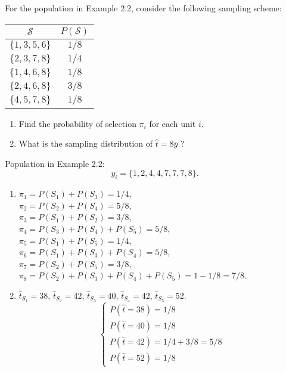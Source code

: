 \documentclass[12pt]{article}
\begin{document}
    
    \begin{exercise}[Lohr-2.2]
        For the population in Example \(2.2\), consider the following sampling scheme:

        \begin{center}
            \begin{tabular}{cc}
                \(\mathcal{S}\) & \(P(\mathcal{S})\) \\
                \hline\(\{1,3,5,6\}\) & \(1 / 8\) \\
                \(\{2,3,7,8\}\) & \(1 / 4\) \\
                \(\{1,4,6,8\}\) & \(1 / 8\) \\
                \(\{2,4,6,8\}\) & \(3 / 8\) \\
                \(\{4,5,7,8\}\) & \(1 / 8\)
            \end{tabular}
            \begin{enumerate}
                \item Find the probability of selection \(\pi_{i}\) for each unit \(i\). 
                \item What is the sampling distribution of \(\hat{t}=8 \bar{y}\) ?
            \end{enumerate}
        \end{center}
        Population in Example 2.2: 
        \[
            y_i = \{1,2,4,4,7,7,7,8\}. 
        \]
    \end{exercise}

    \begin{solution}
        \begin{enumerate}
            \item $\pi_1=P(S_1)+P(S_3)=1/4$, \\
            $\pi_2=P(S_2)+P(S_4)=5/8$, \\
            $\pi_3=P(S_1)+P(S_2)=3/8$, \\
            $\pi_4=P(S_3)+P(S_4)+P(S_5)=5/8$, \\
            $\pi_5=P(S_1)+P(S_5)=1/4$, \\
            $\pi_6=P(S_1)+P(S_3)+P(S_4)=5/8$, \\
            $\pi_7=P(S_2)+P(S_5)=3/8$, \\
            $\pi_8=P(S_2)+P(S_3)+P(S_4)+P(S_5)=1-1/8=7/8$. 
            \item $\hat{t}_{S_1}=38$, $\hat{t}_{S_2}=42$, $\hat{t}_{S_3}=40$, $\hat{t}_{S_4}=42$, $\hat{t}_{S_5}=52$. 
            \[
                \left\{\begin{array}{l}
                    P(\hat{t}=38)=1/8 \\
                    P(\hat{t}=40)=1/8 \\
                    P(\hat{t}=42)=1/4+3/8=5/8 \\
                    P(\hat{t}=52)=1/8
                \end{array}\right.
            \]
        \end{enumerate}
    \end{solution}
\end{document}
